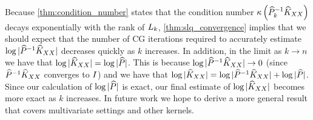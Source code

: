 Because \cref{thm:condition_number} states that the condition number $\kappa \left( \widehat{P}_{k}^{-1}\widehat{K}_{XX} \right)$ decays exponentially with the rank of $L_{k}$, \cref{thm:slq_convergence} implies that we should expect that the number of CG iterations required to accurately estimate $\log \vert \widehat{P}^{-1}\widehat{K}_{XX} \vert$ decreases quickly as $k$ increases.
In addition, in the limit as $k \rightarrow n$ we have that $\log \vert \widehat{K}_{XX} \vert = \log \vert \widehat{P} \vert$.
This is because $\log \vert \widehat{P}^{-1}\widehat{K}_{XX} \vert \rightarrow 0$ (since $\widehat{P}^{-1}\widehat{K}_{XX}$ converges to $I$) and we have that $\log \vert \widehat{K}_{XX} \vert = \log \vert \widehat{P}^{-1}\widehat{K}_{XX} \vert + \log \vert \widehat{P} \vert$.
Since our calculation of $\log \vert \widehat{P} \vert$ is exact, our final estimate of $\log \vert \widehat{K}_{XX} \vert$ becomes more exact as $k$ increases.
In future work we hope to derive a more general result that covers multivariate settings and other kernels.
%

